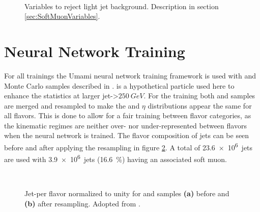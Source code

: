 \begin{figure}[]
  \centering
  \\
  \caption{Variables to reject light jet background. Description in section \ref{sec:SoftMuonVariables}.}
  \label{fig:softMuonVariables2}
\end{figure}


\section{Neural Network Training}
For all trainings the Umami neural network training framework \citep{Froch:2857164} is used with \ttbar and \Zprime Monte Carlo samples described in \citep{ATL-PHYS-PUB-2017-013}. \Zprime is a hypothetical particle used here to enhance the statistics at larger jet-\pt>$\SI{250}{GeV}$. For the training both \ttbar and \Zprime samples are merged and resampled to make the \pt and $\eta$ distributions appear the same for all flavors. This is done to allow for a fair training between flavor categories, as the kinematic regimes are neither over- nor under-represented between flavors when the neural network is trained. The flavor composition of jets can be seen before and after applying the resampling in figure \ref{fig:resampling}. A total of \qty{23.6e6}{jets} are used with \qty{3.9e6}{jets} (\qty{16.6}{\percent}) having an associated soft muon.
\begin{figure}
  \centering
  \\
  \caption[]{Jet-\pt per flavor normalized to unity for \ttbar and \Zprime samples \textbf{(a)} before and \textbf{(b)} after resampling. Adopted from \citep{umamiDocs}.}
  \label{fig:resampling}
\end{figure}


